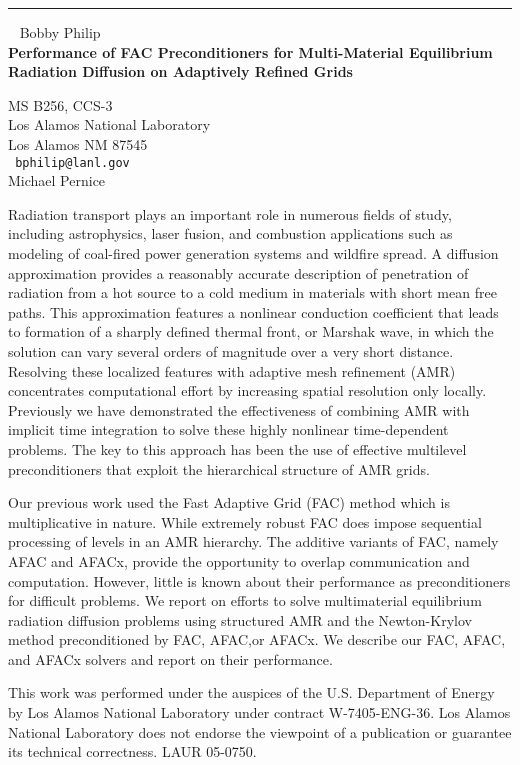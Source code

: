 \documentclass{report}
\begin{document}
\begin{center}

\rule{6in}{1pt} \
{\large
Bobby Philip
\\ {\bf
Performance of FAC Preconditioners for Multi-Material Equilibrium
Radiation Diffusion on Adaptively Refined Grids
}}

MS B256, CCS-3 \\
Los Alamos National Laboratory \\
Los Alamos NM 87545
\\ {\tt
bphilip@lanl.gov
}
\\
Michael Pernice
\end{center}

Radiation transport plays an important role in numerous fields of
study, including astrophysics, laser fusion, and combustion
applications such as modeling of coal-fired power generation systems
and wildfire spread. A diffusion approximation provides a reasonably
accurate description of penetration of radiation from a hot source to
a cold medium in materials with short mean free paths. This
approximation features a nonlinear conduction coefficient that leads
to formation of a sharply defined thermal front, or Marshak wave, in
which the solution can vary several orders of magnitude over a very
short distance. Resolving these localized features with adaptive mesh
refinement (AMR) concentrates computational effort by increasing
spatial resolution only locally. Previously we have demonstrated the
effectiveness of combining AMR with implicit time integration to solve
these highly nonlinear time-dependent problems. The key to this
approach has been the use of effective multilevel preconditioners that
exploit the hierarchical structure of AMR grids.

Our previous work used the Fast Adaptive Grid (FAC) method which is
multiplicative in nature. While extremely robust FAC does impose
sequential processing of levels in an AMR hierarchy. The additive
variants of FAC, namely AFAC and AFACx, provide the opportunity to
overlap communication and computation. However, little is known about
their performance as preconditioners for difficult problems. We report
on efforts to solve multimaterial equilibrium radiation diffusion
problems using structured AMR and the Newton-Krylov method
preconditioned by FAC, AFAC,or AFACx. We describe our FAC, AFAC, and
AFACx solvers and report on their performance.

This work was performed under the auspices of the U.S. Department of
Energy by Los Alamos National Laboratory under contract W-7405-ENG-36.
Los Alamos National Laboratory does not endorse the viewpoint of a
publication or guarantee its technical correctness. LAUR 05-0750.
\end{document}
